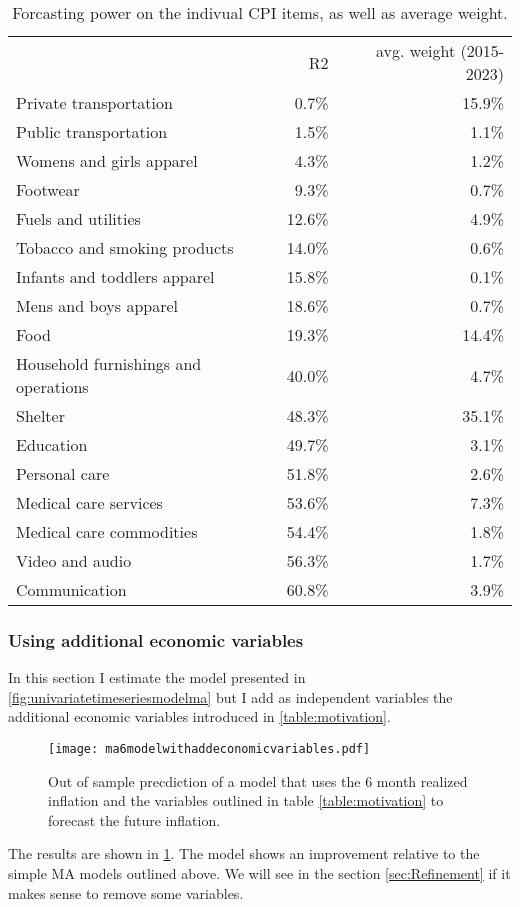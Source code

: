 \documentclass[12pt]{article}
\begin{document}
\begin{adjustwidth}{-2cm}{}
\begin{table}

\begin{tabular}{lrr}
{} & {R2} & {avg. weight (2015-2023)} \\
Private transportation & 0.7\% & 15.9\% \\
Public transportation & 1.5\% & 1.1\% \\
Womens and girls apparel & 4.3\% & 1.2\% \\
Footwear & 9.3\% & 0.7\% \\
Fuels and utilities & 12.6\% & 4.9\% \\
Tobacco and smoking products & 14.0\% & 0.6\% \\
Infants and toddlers apparel & 15.8\% & 0.1\% \\
Mens and boys apparel & 18.6\% & 0.7\% \\
Food & 19.3\% & 14.4\% \\
Household furnishings and operations & 40.0\% & 4.7\% \\
Shelter & 48.3\% & 35.1\% \\
Education & 49.7\% & 3.1\% \\
Personal care & 51.8\% & 2.6\% \\
Medical care services & 53.6\% & 7.3\% \\
Medical care commodities & 54.4\% & 1.8\% \\
Video and audio & 56.3\% & 1.7\% \\
Communication & 60.8\% & 3.9\% \\
\end{tabular}


\caption{Forcasting power on the indivual CPI items, as well as average weight.}
\label{table:forecast_by_item_r2}
\end{table}
\end{adjustwidth}


\subsubsection{Using additional economic variables}
\label{sec:eco}
In this section I estimate the model presented in \ref{fig:univariatetimeseriesmodelma} but I add as independent variables the additional economic variables introduced in \ref{table:motivation}.
\begin{figure}[h]
    \centering
    \texttt{[image: ma6modelwithaddeconomicvariables.pdf]}
    \caption{Out of sample precdiction of a model that uses the 6 month realized inflation and the variables outlined in table \ref{table:motivation} to forecast the future inflation.}
    \label{fig:ma6modelwithaddvars}
\end{figure}
The results are shown in \ref{fig:ma6modelwithaddvars}. The model shows an improvement relative to the simple MA models outlined above. We will see in the section \ref{sec:Refinement} if it makes sense to remove some variables. 
\end{document}
